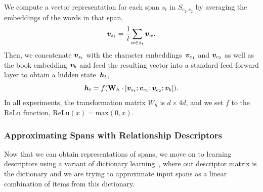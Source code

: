 We compute a vector representation for each span $s_t$ in $S_{c_1,c_2}$ by
averaging the embeddings of the words in that span,
\begin{equation}\label{eq:ave}
\boldsymbol{v}_{s_t} = \frac 1 {l} {\sum_{w \in s_t} \boldsymbol{v}_w}.
\end{equation}
Then, we concatenate $\boldsymbol{v}_{s_t}$ with the character
embeddings~$\boldsymbol{v}_{c_1}$ and $\boldsymbol{v}_{c_2}$ as well as the book embedding
$\boldsymbol{v}_b$ and feed the resulting vector into a standard feed-forward layer to
obtain a hidden state~$\boldsymbol{h}_t$,
\begin{equation}\label{eq:dan}
	\boldsymbol{h}_t = f(\text{\textbf{W}}_h\cdot [\boldsymbol{v}_{s_t};\boldsymbol{v}_{c_1};\boldsymbol{v}_{c_2};\boldsymbol{v}_{b}]).
\end{equation}
In all experiments, the transformation matrix $W_h$ is
$d \times 4d$, and we set $f$ to the $\mbox{ReLu}$ function,
$\mbox{ReLu}(x) = \mathrm{max}(0, x)$.

\subsubsection{Approximating Spans with Relationship Descriptors}

Now that we can obtain representations of spans, we move on to
learning descriptors using a variant of dictionary
learning~\cite{olshausen1997sparse,elad2006image}, where our descriptor matrix 
is the dictionary and we are trying to approximate input spans as a
linear combination of items from this dictionary.













